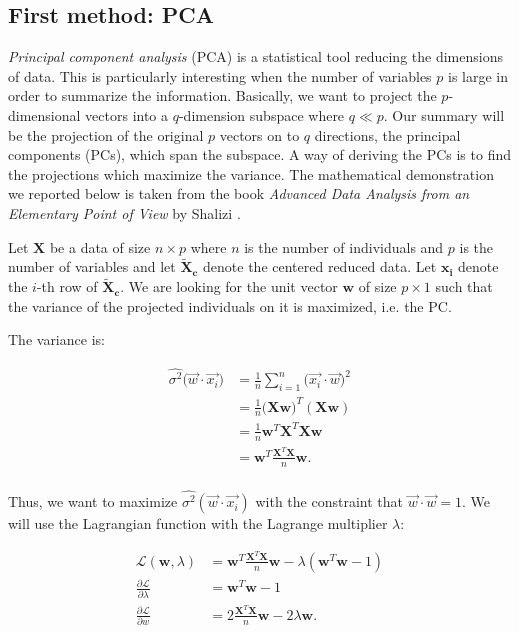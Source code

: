 \subsection{First method: PCA}
\emph{Principal component analysis} (PCA) is a statistical tool reducing the dimensions of data. This is particularly interesting when the number of variables $p$ is large in order to summarize the information. Basically, we want to project the $p$-dimensional vectors into a $q$-dimension subspace where $q \ll p$. Our summary will be the projection of the original $p$ vectors on to $q$ directions, the principal components (PCs), which span the subspace. A way of deriving the PCs is to find the projections which maximize the variance. The mathematical demonstration we reported below is taken from the book \emph{Advanced Data Analysis from an Elementary Point of View} by Shalizi \cite{pca_book}.

Let $\mathbf{X}$ be a data of size $n \times p$ where $n$ is the number of individuals and $p$ is the number of variables and let $\mathbf{\tilde{X}_c}$ denote the centered reduced data. Let $\mathbf{x_i}$ denote the $i$-th row of $\mathbf{\tilde{X}_c}$. We are looking for the unit vector $\mathbf{w}$ of size $p \times 1$ such that the variance of the projected individuals on it is maximized, i.e. the PC. 

\newpage

The variance is:

\begin{align*}
\hat{\sigma^2} \big ( \overrightarrow{w}\cdot \overrightarrow{x_i} \big ) &= \frac{1}{n} \sum_{i=1}^n \big ( \overrightarrow{x_i}\cdot \overrightarrow{w} \big )^2 \\
&= \frac{1}{n} \big (\textbf{Xw})^T (\textbf{Xw}) \\
&= \frac{1}{n} \textbf{w}^T \textbf{X}^T \textbf{Xw} \\
&= \textbf{w}^T \frac{\textbf{X}^T \textbf{X}}{n} \textbf{w}. \\
\end{align*}

Thus, we want to maximize $\hat{\sigma^2} (\overrightarrow{w}\cdot \overrightarrow{x_i}) $ with the constraint that $\overrightarrow{w} \cdot \overrightarrow{w} =1$. We will use the Lagrangian function with the Lagrange multiplier $\lambda$:

\begin{align*}
\mathcal{L} (\textbf{w},\lambda) & = \textbf{w}^T \frac{\textbf{X}^T \textbf{X}}{n} \textbf{w} - \lambda (\textbf{w}^T \textbf{w} -1) \\
\frac{\partial \mathcal{L}}{\partial \lambda} & = \textbf{w}^T\textbf{w} -1 \\
\frac{\partial \mathcal{L}}{\partial w} & = 2\frac{\textbf{X}^T \textbf{X}}{n} \textbf{w} - 2 \lambda \textbf{w}. \\
\end{align*} 

